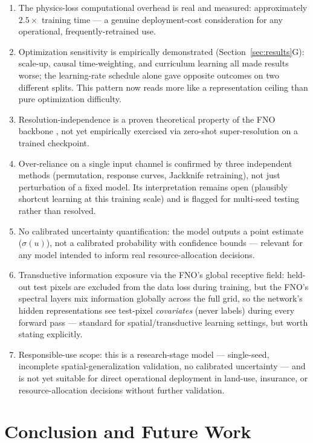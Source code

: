 \documentclass[journal]{IEEEtran}
\begin{document}
\begin{enumerate}
\item The physics-loss computational overhead is real and measured: approximately $2.5\times$ training time --- a genuine deployment-cost consideration for any operational, frequently-retrained use.
\item Optimization sensitivity is empirically demonstrated (Section~\ref{sec:results}G): scale-up, causal time-weighting, and curriculum learning all made results worse; the learning-rate schedule alone gave opposite outcomes on two different splits. This pattern now reads more like a representation ceiling than pure optimization difficulty.
\item Resolution-independence is a proven theoretical property of the FNO backbone \cite{li2023pino,kovachki2021}, not yet empirically exercised via zero-shot super-resolution on a trained checkpoint.
\item Over-reliance on a single input channel is confirmed by three independent methods (permutation, response curves, Jackknife retraining), not just perturbation of a fixed model. Its interpretation remains open (plausibly shortcut learning at this training scale) and is flagged for multi-seed testing rather than resolved.
\item No calibrated uncertainty quantification: the model outputs a point estimate ($\sigma(u)$), not a calibrated probability with confidence bounds --- relevant for any model intended to inform real resource-allocation decisions.
\item Transductive information exposure via the FNO's global receptive field: held-out test pixels are excluded from the data loss during training, but the FNO's spectral layers mix information globally across the full grid, so the network's hidden representations see test-pixel \emph{covariates} (never labels) during every forward pass --- standard for spatial/transductive learning settings, but worth stating explicitly.
\item Responsible-use scope: this is a research-stage model --- single-seed, incomplete spatial-generalization validation, no calibrated uncertainty --- and is not yet suitable for direct operational deployment in land-use, insurance, or resource-allocation decisions without further validation.
\end{enumerate}

\section{Conclusion and Future Work}
\end{document}
